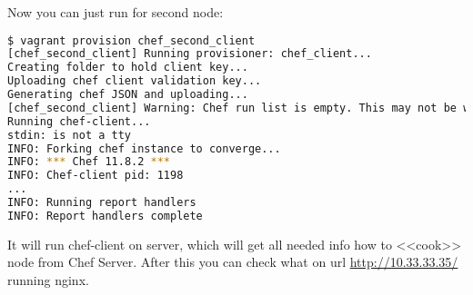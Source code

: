 Now you can just run  for second node:

\begin{lstlisting}[language=Bash,label=lst:my-serer-cloud-role8]
$ vagrant provision chef_second_client
[chef_second_client] Running provisioner: chef_client...
Creating folder to hold client key...
Uploading chef client validation key...
Generating chef JSON and uploading...
[chef_second_client] Warning: Chef run list is empty. This may not be what you want.
Running chef-client...
stdin: is not a tty
INFO: Forking chef instance to converge...
INFO: *** Chef 11.8.2 ***
INFO: Chef-client pid: 1198
...
INFO: Running report handlers
INFO: Report handlers complete
\end{lstlisting}

It will run chef-client on server, which will get all needed info how to <<cook>> node from Chef Server. After this you can check what on url \href{http://10.33.33.35/}{http://10.33.33.35/} running nginx.

